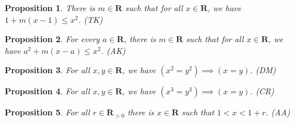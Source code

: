 \documentclass[12pt,fleqn,answers]{exam}
\newcommand{\reals}{\mathbf{R}}
\newtheorem{prop}{Proposition}
\begin{document}
     \begin{prop}
      There is $m \in \reals$ such that for all $x \in \reals$, we 
     have $1 + m(x-1) \leq x^2$. \hfill (TK)
     \end{prop}

     \begin{prop} For every $a \in \reals$, there is $m \in \reals$ such 
     that for all $x \in \reals$, we have $a^2 + m(x-a) \leq x^2$. \hfill (AK)
     \end{prop}

     \begin{prop} For all $x,y \in \reals$, we have $(x^2 = y^2) \implies (x=y)$. 
     \hfill (DM)
     \end{prop} 

    \begin{prop} For all $x,y \in \reals$, we have $(x^3 = y^3) \implies (x=y)$. 
    \hfill (CR) 
    \end{prop}

    \begin{prop} For all $r \in \reals_{>0}$ there is $x \in \reals$
      such that $1 < x < 1+r$. \hfill (AA)
    \end{prop} 
\end{document}
